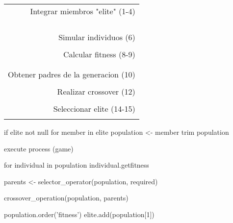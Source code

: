 \noindent%
\begin{Heardlisting}{%
   \begin{tabular}{r}%
      Integrar miembros "elite" (1-4)\\ \\  \\  \\  \\
      Simular individuos (6)\\  \\
      Calcular fitness (8-9)\\  \\  \\
      Obtener padres de la generacion (10)\\  \\
      Realizar crossover (12)\\ \\
      Seleccionar elite (14-15)\\ \\
   \end{tabular}
}
if elite not null
   for member in elite
      population <- member
      trim population

execute process (game)

for individual in population
   individual.getfitness

parents <- selector_operator(population, required)

crossover_operation(population, parents)

population.order('fitness')
elite.add(population[1])
\end{Heardlisting}